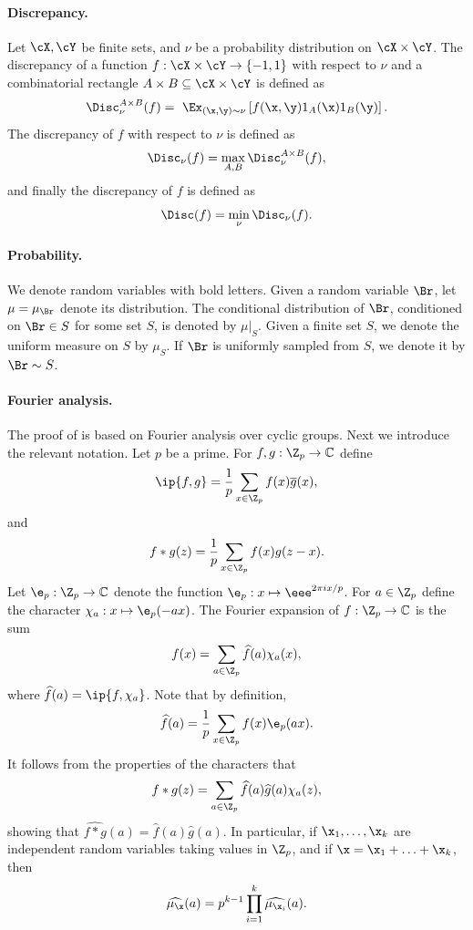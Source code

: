 \paragraph{Discrepancy.}
Let $\cX, \cY$ be finite sets, and  $\nu$ be a probability distribution on $\cX \times  \cY$.
The discrepancy of a function $f: \cX \times  \cY \to \{-1,1\}$ with respect to $\nu$ and a combinatorial rectangle $A \times B \subseteq \cX \times \cY$  is  defined as
$$\Disc^{A \times B}_\nu(f) = \ \Ex_{(\x,\y) \sim \nu}  \left[ f(\x,\y) 1_{A}(\x)1_B(\y) \right].$$
The discrepancy  of $f$ with respect to $\nu$ is defined as
$$\Disc_\nu(f)  = \max_{A ,B} \Disc^{A \times B}_\nu(f),$$
and finally the discrepancy of $f$ is defined as
$$\Disc(f) = \min_\nu \Disc_\nu(f).$$



\paragraph{Probability.}
We denote random variables with bold letters. Given a random variable $\Br$, let $\mu=\mu_{\Br}$ denote its distribution. The conditional distribution of $\Br$, conditioned on $\Br \in S$ for some set $S$, is denoted by $\mu|_{S}$. Given a finite set $S$, we denote the uniform measure on $S$ by $\mu_S$.
If $\Br$ is uniformly sampled from $S$, we denote it by $\Br \sim S$.


\paragraph{Fourier analysis.}
The proof of  is based on Fourier analysis over cyclic groups.
%
Next we introduce the relevant  notation.  %
Let $p$ be a prime. For $f,g: \Z_p \to \mathbb{C}$ define
$$\ip{f,g} = \frac{1}{p} \sum_{x \in \Z_p} f(x) \overline{g}(x),$$
and
$$f*g(z) = \frac{1}{p} \sum_{x\in \Z_p} f(x)g(z-x). $$
Let $\e_p: \Z_p \to \mathbb{C}$ denote the function 
$\e_p:x \mapsto \eee^{2\pi i x /p}$. For $a \in \Z_p$ define the character $\chi_a:x \mapsto \e_p(-ax)$. The Fourier expansion of $f:\Z_p \to \mathbb{C}$ is the sum
$$f(x) = \sum_{{a\in \Z_p}} \widehat{f}(a) \chi_a(x),$$
where $\widehat{f}(a)= \ip{f, \chi_a}$. Note that by definition, $$\widehat{f}(a)=\frac{1}{p} \sum_{x \in \Z_p} f(x) \e_p(ax).$$
It follows from the properties of the characters that
$$f*g(z) = \sum_{{a\in \Z_p}} \widehat{f}(a)\widehat{g}(a) \chi_a(z),$$
showing that $\widehat{f*g}(a)= \widehat{f}(a)\widehat{g}(a)$. In particular, if $\x_1,\ldots,\x_k$ are independent random variables
taking values in $\Z_p$, and if $\x=\x_1+\ldots+\x_k$, then
$$
\widehat{\mu_{\x}}(a) = p^{k-1} \prod_{i=1}^k \widehat{\mu_{\x_i}}(a).
$$

